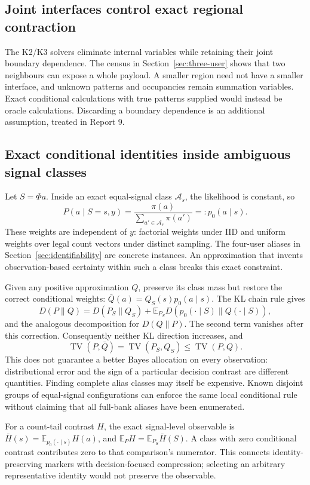 \documentclass[10pt,a4paper]{article}
\newcommand{\E}{\mathbb E}
\begin{document}
\subsection{Joint interfaces control exact regional contraction}
The K2/K3 solvers eliminate internal variables while retaining their joint boundary dependence. The census
in Section~\ref{sec:three-user} shows that two neighbours can expose a whole payload. A smaller region need
not have a smaller interface, and unknown patterns and occupancies remain summation variables. Exact
conditional calculations with true patterns supplied would instead be oracle calculations. Discarding a
boundary dependence is an additional assumption, treated in Report 9.

\clearpage
\subsection{Exact conditional identities inside ambiguous signal classes}
Let $S=\Phi a$. Inside an exact equal-signal class $\mathcal A_s$, the likelihood is constant, so
\begin{equation}
 P(a\mid S=s,y)=\frac{\pi(a)}{\sum_{a'\in\mathcal A_s}\pi(a')}
 =:p_0(a\mid s).
 \label{eq:alias-conditional}
\end{equation}
These weights are independent of $y$: factorial weights under IID and uniform weights over legal count vectors
under distinct sampling. The four-user aliases in Section~\ref{sec:identifiability} are concrete instances.
An approximation that invents observation-based certainty within such a class breaks this exact constraint.

Given any positive approximation $Q$, preserve its class mass but restore the correct conditional weights:
$\bar Q(a)=Q_S(s)p_0(a\mid s)$. The KL chain rule gives
\[
 D(P\|Q)=D(P_S\|Q_S)+\E_{P_S}D(p_0(\cdot\mid S)\|Q(\cdot\mid S)),
\]
and the analogous decomposition for $D(Q\|P)$. The second term vanishes after this correction. Consequently
neither KL direction increases, and
\[
 \operatorname{TV}(P,\bar Q)=\operatorname{TV}(P_S,Q_S)\leq\operatorname{TV}(P,Q).
\]
This does not guarantee a better Bayes allocation on every observation: distributional error and the sign of a
particular decision contrast are different quantities. Finding complete alias classes may itself be expensive.
Known disjoint groups of equal-signal configurations can enforce the same local conditional rule without
claiming that all full-bank aliases have been enumerated.

For a count-tail contrast $H$, the exact signal-level observable is
$\bar H(s)=\E_{p_0(\cdot\mid s)}H(a)$, and $\E_PH=\E_{P_S}\bar H(S)$. A class with zero conditional contrast
contributes zero to that comparison's numerator. This connects identity-preserving markers with decision-focused
compression; selecting an arbitrary representative identity would not preserve the observable.
\end{document}
